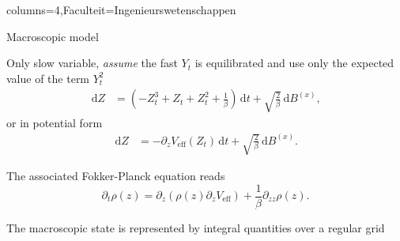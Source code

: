 \documentclass[landscape,a0paper,fontscale=0.45]{kuleuvenposter}
\newcommand{\dd}{\,\mathrm{d}}
\newcommand\eff{\mbox{eff}}
\begin{document}
\begin{poster}{columns=4,Faculteit=Ingenieurswetenschappen}
\begin{posterbox}[name=macroscopic, column=0,below=microscopic, above=bottom]{Macroscopic model}
\begin{noindentitemize}
\item Only slow variable, \emph{assume} the fast $Y_t$ is equilibrated and use only the expected value of the term $Y_t^2$
\begin{align}
\dd Z &= (-Z_t^3 + Z_t + Z_t^2 + \frac{1}{\beta}) \dd t + \sqrt{\frac{2}{\beta}} \dd B^{(x)}, \label{eq:zParisdyn}
\end{align}
or in potential form
\begin{align}
\dd Z &= -\partial_z V_{\eff} (Z_t) \dd t + \sqrt{\frac{2}{\beta}} \dd B^{(x)}. \label{eq:zParisdyn_pot}
\end{align}
%
\item The associated Fokker-Planck equation reads
\begin{equation}
\partial_t \rho(z) = \partial_z \left( \rho(z) \partial_z V_{\eff} \right) + \frac{1}{\beta} \partial_{zz} \rho(z).
\end{equation}
\item The macroscopic state is represented by integral quantities over a regular grid
\end{noindentitemize}
\end{posterbox}


\end{poster}
\end{document}
